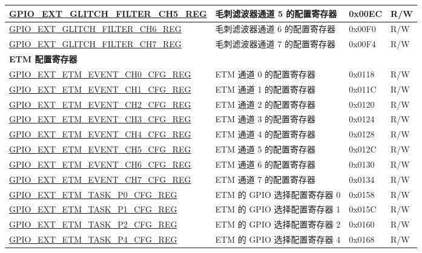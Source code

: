 \begin{longtable}{ | p{6cm} | p{7.2cm} | p{1.3cm} | p{1cm} | }
\hyperref[regdesc:GPIOEXTGLITCHFILTERCHNREG]{GPIO\_EXT\_GLITCH\_FILTER\_CH5\_REG} & 毛刺滤波器通道 5 的配置寄存器 & 0x00EC & R/W \\ \hline
\hyperref[regdesc:GPIOEXTGLITCHFILTERCHNREG]{GPIO\_EXT\_GLITCH\_FILTER\_CH6\_REG} & 毛刺滤波器通道 6 的配置寄存器 & 0x00F0 & R/W \\ \hline
\hyperref[regdesc:GPIOEXTGLITCHFILTERCHNREG]{GPIO\_EXT\_GLITCH\_FILTER\_CH7\_REG} & 毛刺滤波器通道 7 的配置寄存器 & 0x00F4 & R/W \\ \hline
\multicolumn{4}{|l|}{\textbf{ETM 配置寄存器}} \\ \hline
\hyperref[regdesc:GPIOEXTETMEVENTCHNCFGREG]{GPIO\_EXT\_ETM\_EVENT\_CH0\_CFG\_REG} & ETM 通道 0 的配置寄存器 & 0x0118 & R/W \\ \hline
\hyperref[regdesc:GPIOEXTETMEVENTCHNCFGREG]{GPIO\_EXT\_ETM\_EVENT\_CH1\_CFG\_REG} & ETM 通道 1 的配置寄存器 & 0x011C & R/W \\ \hline
\hyperref[regdesc:GPIOEXTETMEVENTCHNCFGREG]{GPIO\_EXT\_ETM\_EVENT\_CH2\_CFG\_REG} & ETM 通道 2 的配置寄存器 & 0x0120 & R/W \\ \hline
\hyperref[regdesc:GPIOEXTETMEVENTCHNCFGREG]{GPIO\_EXT\_ETM\_EVENT\_CH3\_CFG\_REG} & ETM 通道 3 的配置寄存器 & 0x0124 & R/W \\ \hline
\hyperref[regdesc:GPIOEXTETMEVENTCHNCFGREG]{GPIO\_EXT\_ETM\_EVENT\_CH4\_CFG\_REG} & ETM 通道 4 的配置寄存器 & 0x0128 & R/W \\ \hline
\hyperref[regdesc:GPIOEXTETMEVENTCHNCFGREG]{GPIO\_EXT\_ETM\_EVENT\_CH5\_CFG\_REG} & ETM 通道 5 的配置寄存器 & 0x012C & R/W \\ \hline
\hyperref[regdesc:GPIOEXTETMEVENTCHNCFGREG]{GPIO\_EXT\_ETM\_EVENT\_CH6\_CFG\_REG} & ETM 通道 6 的配置寄存器 & 0x0130 & R/W \\ \hline
\hyperref[regdesc:GPIOEXTETMEVENTCHNCFGREG]{GPIO\_EXT\_ETM\_EVENT\_CH7\_CFG\_REG} & ETM 通道 7 的配置寄存器 & 0x0134 & R/W \\ \hline
\hyperref[regdesc:GPIOEXTETMTASKP0CFGREG]{GPIO\_EXT\_ETM\_TASK\_P0\_CFG\_REG} & ETM 的 GPIO 选择配置寄存器 0 & 0x0158 & R/W \\ \hline
\hyperref[regdesc:GPIOEXTETMTASKP1CFGREG]{GPIO\_EXT\_ETM\_TASK\_P1\_CFG\_REG} & ETM 的 GPIO 选择配置寄存器 1 & 0x015C & R/W \\ \hline
\hyperref[regdesc:GPIOEXTETMTASKP2CFGREG]{GPIO\_EXT\_ETM\_TASK\_P2\_CFG\_REG} & ETM 的 GPIO 选择配置寄存器 2 & 0x0160 & R/W \\ \hline
\hyperref[regdesc:GPIOEXTETMTASKP4CFGREG]{GPIO\_EXT\_ETM\_TASK\_P4\_CFG\_REG} & ETM 的 GPIO 选择配置寄存器 4 & 0x0168 & R/W \\ \hline

\end{longtable}
